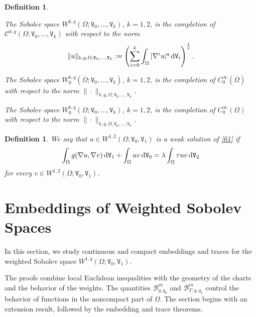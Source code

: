 \documentclass[reqno, 11pt, a4paper]{amsart}
\newtheorem{definition}[theorem]{Definition}
\numberwithin{equation}{section}
\newcommand{\iwe}{ \tau}
\newcommand{\womd}{W^{1,2} (\Omega ; \mathtt{V} _0 , \mathtt{V} _1)}
\newcommand{\wghtv}{\mathtt{V}}
\newcommand{\dwv}{\textnormal{d} \mathtt{V}}
\newcommand{\qxp}{q}
\begin{document}
\begin{definition}$ $
\begin{enumerate}[label=(\roman*)]

{ 
\item The Sobolev space $W^{k,\qxp}(\Omega;\wghtv_0,\ldots,\wghtv_k)$, $k=1,2$, is the completion of $\mathcal{C}^{k,\qxp}(\Omega;\wghtv_0,\ldots,\wghtv_k)$ with respect to the norm
\[
\|u\|_{k,\qxp,\Omega,\wghtv_0,\ldots,\wghtv_k}
:=
\left(
\sum_{i=0}^k\int_\Omega|\nabla^iu|^{\qxp}\,\dwv_i
\right)^{\frac1{\qxp}}.
\]
}

{ 
\item The Sobolev space $W_0^{k,\qxp}(\overline\Omega;\wghtv_0,\ldots,\wghtv_k)$, $k=1,2$, is the completion of $C_0^\infty(\overline\Omega)$ with respect to the norm $\|\cdot\|_{k,\qxp,\Omega,\wghtv_0,\ldots,\wghtv_k}$.
}

{ 
\item The Sobolev space $W_0^{k,\qxp}(\Omega;\wghtv_0,\ldots,\wghtv_k)$, $k=1,2$, is the completion of $C_0^\infty(\Omega)$ with respect to the norm $\|\cdot\|_{k,\qxp,\Omega,\wghtv_0,\ldots,\wghtv_k}$.
}
\end{enumerate}
\end{definition}

\begin{definition}
We say that $u\in\womd$ is a weak solution of \eqref{61} if
\[
\int_\Omega g(\nabla u,\nabla v)\,\dwv_1
+
\int_\Omega uv\,\dwv_0
=
\lambda\int_\Omega\iwe uv\,\dwv_2
\]
for every $v\in\womd$.
\end{definition}




\section{Embeddings of Weighted Sobolev Spaces} \label{142}


In this section, we study continuous and compact embeddings and traces
for the weighted Sobolev space $W^{1,\qxp}(\Omega;\wghtv_0,\wghtv_1)$.

The proofs combine local Euclidean inequalities with the geometry of
the charts and the behavior of the weights. The quantities
\(\mathcal B_{\qxp,\qxp_0}^m\) and
\(\mathcal B_{\Gamma,\qxp,\qxp_1}^m\) control the behavior of functions
in the noncompact part of \(\Omega\). The section begins with an
extension result, followed by the embedding and trace theorems.
\end{document}
